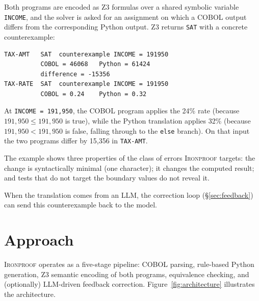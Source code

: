 \documentclass[sigconf,nonacm]{acmart}
\begin{document}
Both programs are encoded as Z3 formulas over a shared symbolic variable \texttt{INCOME}, and the solver is asked for an assignment on which a COBOL output differs from the corresponding Python output. Z3 returns \texttt{SAT} with a concrete counterexample:

\begin{lstlisting}[style=z3style,caption={Solver result for Listings~\ref{lst:cobol-tax} and~\ref{lst:python-buggy}, condensed from the tool's output. Inputs and command: \texttt{papers/motivating/}.},label={lst:z3-output}]
TAX-AMT   SAT  counterexample INCOME = 191950
          COBOL = 46068   Python = 61424
          difference = -15356
TAX-RATE  SAT  counterexample INCOME = 191950
          COBOL = 0.24    Python = 0.32
\end{lstlisting}

At \texttt{INCOME = 191{,}950}, the COBOL program applies the 24\% rate (because $191{,}950 \leq 191{,}950$ is true), while the Python translation applies 32\% (because $191{,}950 < 191{,}950$ is false, falling through to the \texttt{else} branch). On that input the two programs differ by 15{,}356 in \texttt{TAX-AMT}.

The example shows three properties of the class of errors \textsc{Ironproof} targets: the change is syntactically minimal (one character); it changes the computed result; and tests that do not target the boundary values do not reveal it.

When the translation comes from an LLM, the correction loop (\S\ref{sec:feedback}) can send this counterexample back to the model.


\section{Approach}\label{sec:approach}

\textsc{Ironproof} operates as a five-stage pipeline: COBOL parsing, rule-based Python generation, Z3 semantic encoding of both programs, equivalence checking, and (optionally) LLM-driven feedback correction. Figure~\ref{fig:architecture} illustrates the architecture.
\end{document}
